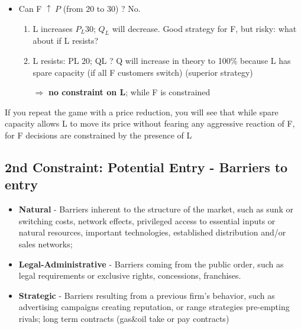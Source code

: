 \begin{enumerate}
{\begin{itemize}
\begin{enumerate}
                        \end{enumerate}
                    \item Can F \(\uparrow \ P\) (from $20$ to $30$) ? No.
                        \begin{enumerate}
                            \item L increases $P_L 30$; $Q_L$ will decrease. Good strategy for F, but risky: what about if L resists?
                            \item L resists: PL 20; QL ? Q will increase in theory to 100\% because L has spare capacity (if all F customers switch) (superior strategy)
                            \item[\(\Rightarrow\)] \textbf{no constraint on L}; while F is constrained
                        \end{enumerate}
                \end{itemize}
                If you repeat the game with a price reduction, you will see that while spare capacity allows L to move its price without fearing any aggressive reaction of F, for F decisions are constrained by the presence of L
                }
                
    \end{enumerate}

    \subsection{2nd Constraint: Potential Entry - Barriers to entry}


        \begin{itemize}
            \item \textbf{Natural} - Barriers inherent to the structure of the market, such as sunk or switching costs, network effects, privileged access to essential inputs or natural resources, important technologies, established distribution and/or sales networks; 
            \item \textbf{Legal-Administrative} - Barriers coming from the public order, such as legal requirements or exclusive rights, concessions, franchises. 
            \item \textbf{Strategic} - Barriers resulting from a previous firm’s behavior, such as advertising campaigns creating reputation, or range strategies pre-empting rivals; long term contracts (gas\&oil take or pay contracts)
        \end{itemize}

